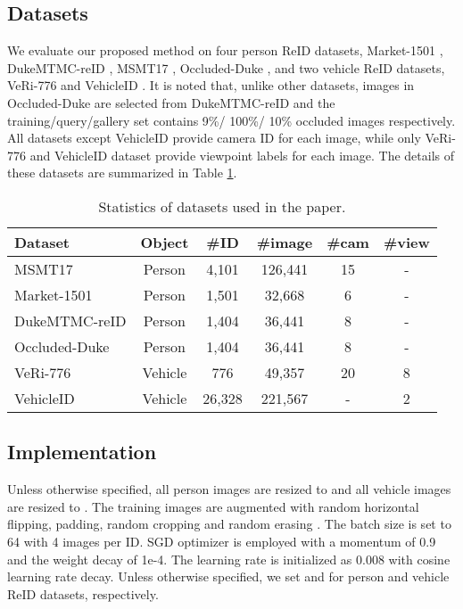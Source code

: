 \documentclass[10pt,twocolumn,letterpaper]{article}
\begin{document}
 \subsection{Datasets}
 We evaluate our proposed method on four person ReID datasets, Market-1501 \cite{Market1501}, DukeMTMC-reID \cite{DukeMTMC-reID}, MSMT17 \cite{MSMT17}, Occluded-Duke \cite{miao2019pose}, and two vehicle ReID datasets, VeRi-776 \cite{VeRi776} and VehicleID \cite{VehicleID}. It is noted that, unlike other datasets, images in Occluded-Duke are selected from DukeMTMC-reID and the training/query/gallery set contains 9\%/ 100\%/ 10\% occluded images respectively. All datasets except VehicleID provide camera ID for each image, while only VeRi-776 and VehicleID dataset provide viewpoint labels for each image. The details of these datasets are summarized in Table \ref{tab:dataset}.
 
\begin{table}[ht]
    \centering
    \footnotesize
        \begin{tabular}{ l|ccccc}
        \hline
        Dataset   & Object    & \#ID   & \#image    & \#cam  & \#view  \\
        \hline
        MSMT17  &Person & 4,101  & 126,441    &15 & -   \\
        Market-1501  &Person & 1,501  & 32,668    &6 & -   \\
        DukeMTMC-reID  &Person & 1,404  & 36,441    &8 & -   \\
        Occluded-Duke  &Person & 1,404  & 36,441    &8 & -   \\
        VeRi-776  &Vehicle & 776  & 49,357     &20 & 8   \\
        VehicleID  &Vehicle & 26,328  & 221,567    &- & 2   \\
        \hline
        \end{tabular}
    \caption{ Statistics of datasets used in the paper.}                    \label{tab:dataset}
\end{table}
 
 
 \subsection{Implementation}
Unless otherwise specified, all person images are resized to  and all vehicle images are resized to . The training images are augmented with random horizontal flipping, padding, random cropping and random erasing \cite{random_erase3}. The batch size is set to 64 with 4 images per ID. SGD optimizer is employed with a momentum of 0.9 and the weight decay of 1e-4. The learning rate is initialized as 0.008 with cosine learning rate decay. Unless otherwise specified, we set  and  for person and vehicle ReID datasets, respectively.
\end{document}
